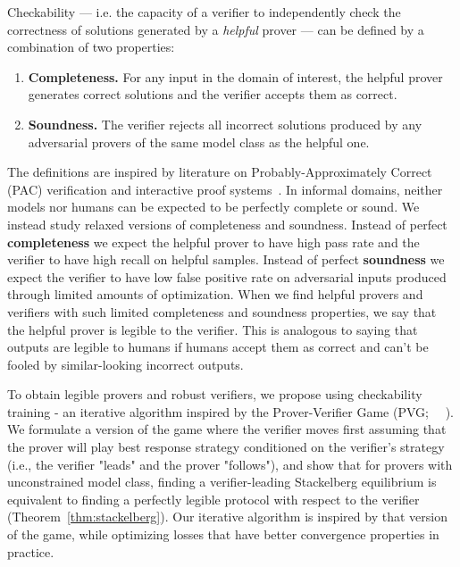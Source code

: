 \documentclass{article}
\begin{document}
Checkability --- i.e. the capacity of a verifier to independently check the correctness of solutions generated by a {\em helpful} prover --- can be defined by a combination of two properties:
\begin{enumerate}
     \item \textbf{Completeness.} For any input in the domain of interest, the helpful prover generates correct solutions and the verifier accepts them as correct.
     \item \textbf{Soundness.} The verifier rejects all incorrect solutions produced by any adversarial provers of the same model class as the helpful one. 
 \end{enumerate} The definitions are inspired by literature on Probably-Approximately Correct (PAC) verification and interactive proof systems~\citep{goldwasser2021interactive,pmlr-v195-mutreja23a}. In informal domains, neither models nor humans can be expected to be perfectly complete or sound. We instead study relaxed versions of completeness and soundness. Instead of perfect \textbf{completeness} we expect the helpful prover to have high pass rate and the verifier to have high recall on helpful samples. Instead of perfect \textbf{soundness} we expect the verifier to have low false positive rate on adversarial inputs produced through limited amounts of optimization. When we find helpful provers and verifiers with such limited completeness and soundness properties, we say that the helpful prover is legible to the verifier. This is analogous to saying that outputs are legible to humans if humans accept them as correct and can't be fooled by similar-looking incorrect outputs.


To obtain legible provers and robust verifiers, we propose using checkability training - an iterative algorithm inspired by the Prover-Verifier Game (PVG;~\citeauthor{anil2021learning} ~\citeyear{anil2021learning}). We formulate a version of the game where the verifier moves first assuming that the prover will play best response strategy conditioned on the verifier's strategy (i.e., the verifier "leads" and the prover "follows"), and show that for provers with unconstrained model class, finding a verifier-leading Stackelberg equilibrium is equivalent to finding a perfectly legible protocol with respect to the verifier (Theorem~\ref{thm:stackelberg}). Our iterative algorithm is inspired by that version of the game, while optimizing losses that have better convergence properties in practice.
\end{document}
